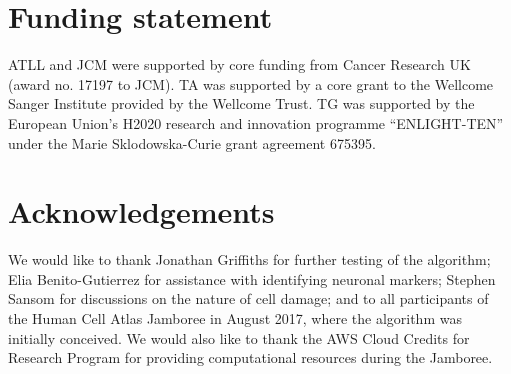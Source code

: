 \documentclass[10pt,letterpaper]{article}
\begin{document}
\section*{Funding statement}
ATLL and JCM were supported by core funding from Cancer Research UK (award no. 17197 to JCM).
TA was supported by a core grant to the Wellcome Sanger Institute provided by the Wellcome Trust.
TG was supported by the European Union's H2020 research and innovation programme ``ENLIGHT-TEN'' under the Marie Sklodowska-Curie grant agreement 675395.

\section*{Acknowledgements}
We would like to thank Jonathan Griffiths for further testing of the algorithm;
Elia Benito-Gutierrez for assistance with identifying neuronal markers;
Stephen Sansom for discussions on the nature of cell damage;
and to all participants of the Human Cell Atlas Jamboree in August 2017, where the algorithm was initially conceived.
We would also like to thank the AWS Cloud Credits for Research Program for providing computational resources during the Jamboree.



\end{document}
